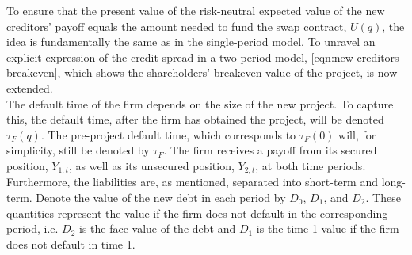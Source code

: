\documentclass[main.tex]{subfiles}
\begin{document}
        To ensure that the present value of the risk-neutral expected value of the new creditors' payoff equals the amount needed to fund the swap contract, $U(q)$,
        the idea is fundamentally the same as in the single-period model.
        To unravel an explicit expression of the credit spread in a two-period model,
        \cref{eqn:new-creditors-breakeven}, which shows the shareholders' breakeven value of the project, is now extended.
        \\
        The default time of the firm depends on the size of the new project.
        To capture this, the default time, after the firm has obtained the project, 
        will be denoted $\tau_{F}(q)$.
        The pre-project default time, which corresponds to $\tau_{F}(0)$ will, for simplicity,
        still be denoted by $\tau_{F}$.
        The firm receives a payoff from its secured position, $Y_{1,t}$, 
        as well as its unsecured position, $Y_{2,t}$, at both time periods.
        Furthermore, the liabilities are, as mentioned, separated into short-term and long-term.
        Denote the value of the new debt in each period by $D_{0}$, $D_{1}$, and $D_{2}$.
        These quantities represent the value if the firm does not default in the corresponding period,
        i.e. $D_{2}$ is the face value of the debt and $D_{1}$ 
        is the time 1 value if the firm does not default in time 1.
\end{document}
